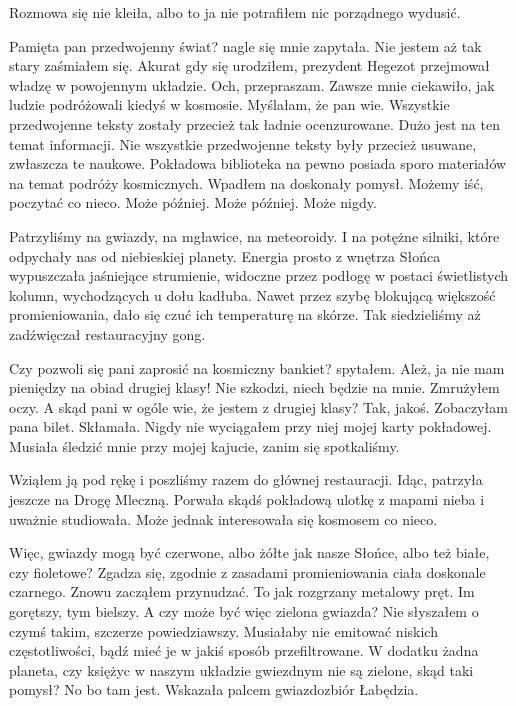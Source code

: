 Rozmowa się nie kleiła, albo to ja nie potrafiłem nic porządnego wydusić.

\begin{dialogue}
	\ds{} Pamięta pan przedwojenny świat? \dm{} nagle się mnie zapytała. 
	\ds{} Nie jestem aż tak stary \dm{} zaśmiałem się. \dm{} Akurat gdy się urodziłem, prezydent Hegezot przejmował władzę w powojennym układzie.
	\ds{} Och, przepraszam. Zawsze mnie ciekawiło, jak ludzie podróżowali kiedyś w kosmosie. Myślałam, że pan wie. Wszystkie przedwojenne teksty zostały przecież tak ładnie ocenzurowane.
	\ds{} Dużo jest na ten temat informacji. Nie wszystkie przedwojenne teksty były przecież usuwane, zwłaszcza te naukowe. Pokładowa biblioteka na pewno posiada sporo materiałów na temat podróży kosmicznych. \dm{} Wpadłem na doskonały pomysł. \dm{} Możemy iść, poczytać co nieco.
	\ds{} Może później.
	\ds{} Może później. \dm{} Może nigdy.
\end{dialogue}

Patrzyliśmy na gwiazdy, na mgławice, na meteoroidy. I na potężne silniki, które odpychały nas od niebieskiej planety.
Energia prosto z wnętrza Słońca wypuszczała jaśniejące strumienie, widoczne przez podłogę w postaci świetlistych kolumn, wychodzących u dołu kadłuba.
Nawet przez szybę blokującą większość promieniowania, dało się czuć ich temperaturę na skórze.
Tak siedzieliśmy aż zadźwięczał restauracyjny gong.

\begin{dialogue}
	\ds{} Czy pozwoli się pani zaprosić na kosmiczny bankiet? \dm{} spytałem.
	\ds{} Ależ, ja nie mam pieniędzy na obiad drugiej klasy!
	\ds{} Nie szkodzi, niech będzie na mnie. \dm{} Zmrużyłem oczy. \dm{} A skąd pani w ogóle wie, że jestem z drugiej klasy?
	\ds{} Tak, jakoś. Zobaczyłam pana bilet. \dm{} Skłamała. Nigdy nie wyciągałem przy niej mojej karty pokładowej. Musiała śledzić mnie przy mojej kajucie, zanim się spotkaliśmy.
\end{dialogue}

Wziąłem ją pod rękę i poszliśmy razem do głównej restauracji.
Idąc, patrzyła jeszcze na Drogę Mleczną. Porwała skądś pokładową ulotkę z mapami nieba i uważnie studiowała.
Może jednak interesowała się kosmosem co nieco.

\begin{dialogue}
	\ds{} Więc, gwiazdy mogą być czerwone, albo żółte jak nasze Słońce, albo też białe, czy fioletowe?
	\ds{} Zgadza się, zgodnie z zasadami promieniowania ciała doskonale czarnego. \dm{} Znowu zacząłem przynudzać. \dm{} To jak rozgrzany metalowy pręt.
		Im gorętszy, tym bielszy.
	\ds{} A czy może być więc zielona gwiazda?
	\ds{} Nie słyszałem o czymś takim, szczerze powiedziawszy. Musiałaby nie emitować niskich częstotliwości, bądź mieć je w jakiś sposób przefiltrowane.
		W dodatku żadna planeta, czy księżyc w naszym układzie gwiezdnym nie są zielone, skąd taki pomysł?
	\ds{} No bo tam jest. \dm{} Wskazała palcem gwiazdozbiór Łabędzia.
\end{dialogue}

